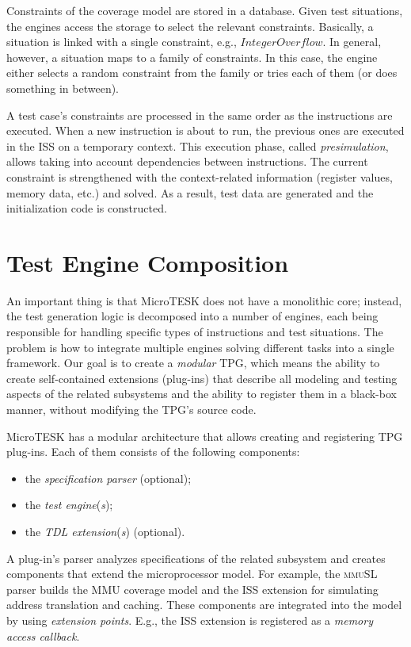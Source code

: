 Constraints of the coverage model are stored in a database.
Given test situations, the engines access the storage to select the relevant constraints.
Basically, a situation is linked with a single constraint, e.g., $IntegerOverflow$.
In general, however, a situation maps to a family of constraints.
In this case, the engine either selects a random constraint from the family or tries each of them (or does something in between).

A test case's constraints are processed in the same order as the instructions are executed.
When a new instruction is about to run, the previous ones are executed in the ISS on a temporary context.
This execution phase, called \emph{presimulation}, allows taking into account dependencies between instructions.
The current constraint is strengthened with the context-related information (register values, memory data, etc.) and solved.
As a result, test data are generated and the initialization code is constructed.

\section{Test Engine Composition}

An important thing is that MicroTESK does not have a monolithic core;
instead, the test generation logic is decomposed into a number of engines, each being responsible for handling specific types of instructions and test situations.
The problem is how to integrate multiple engines solving different tasks into a single framework.
Our goal is to create a \emph{modular} TPG,
which means the ability to create self-contained extensions (plug-ins) that describe all modeling and testing aspects of the related subsystems and
the ability to register them in a black-box manner, without modifying the TPG's source code.

MicroTESK has a modular architecture that allows creating and registering TPG plug-ins.
Each of them consists of the following components:

\begin{itemize}
\item
the \emph{specification parser} (optional);
\item
the \emph{test engine}(\emph{s});
\item
the \emph{TDL extension}(\emph{s}) (optional).
\end{itemize}

A plug-in's parser analyzes specifications of the related subsystem and creates components that extend the microprocessor model.
For example, the \textsc{mmuSL} parser builds the MMU coverage model and the ISS extension for simulating address translation and caching.
These components are integrated into the model by using \emph{extension points}.
E.g., the ISS extension is registered as a \emph{memory access callback}.

